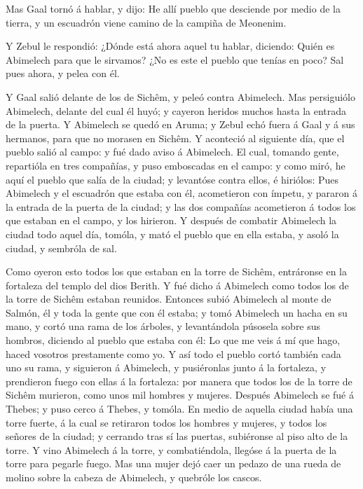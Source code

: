  Mas Gaal tornó á hablar, y dijo: He allí pueblo que
desciende por medio de la tierra, y un escuadrón viene camino de la
campiña de Meonenim.

 Y Zebul le respondió: ¿Dónde está ahora aquel tu hablar,
diciendo: Quién es Abimelech para que le sirvamos? ¿No es este el pueblo
que tenías en poco? Sal pues ahora, y pelea con él.

 Y Gaal salió delante de los de Sichêm, y peleó contra
Abimelech.  Mas persiguiólo Abimelech, delante del cual él
huyó; y cayeron heridos muchos hasta la entrada de la puerta.
 Y Abimelech se quedó en Aruma; y Zebul echó fuera á Gaal y
á sus hermanos, para que no morasen en Sichêm.  Y aconteció
al siguiente día, que el pueblo salió al campo: y fué dado aviso á
Abimelech.  El cual, tomando gente, repartióla en tres
compañías, y puso emboscadas en el campo: y como miró, he aquí el pueblo
que salía de la ciudad; y levantóse contra ellos, é hiriólos:
 Pues Abimelech y el escuadrón que estaba con él,
acometieron con ímpetu, y pararon á la entrada de la puerta de la
ciudad; y las dos compañías acometieron á todos los que estaban en el
campo, y los hirieron.  Y después de combatir Abimelech la
ciudad todo aquel día, tomóla, y mató el pueblo que en ella estaba, y
asoló la ciudad, y sembróla de sal.

 Como oyeron esto todos los que estaban en la torre de
Sichêm, entráronse en la fortaleza del templo del dios Berith.
 Y fué dicho á Abimelech como todos los de la torre de
Sichêm estaban reunidos.  Entonces subió Abimelech al monte
de Salmón, él y toda la gente que con él estaba; y tomó Abimelech un
hacha en su mano, y cortó una rama de los árboles, y levantándola
púsosela sobre sus hombros, diciendo al pueblo que estaba con él: Lo que
me veis á mí que hago, haced vosotros prestamente como yo. 
Y así todo el pueblo cortó también cada uno su rama, y siguieron á
Abimelech, y pusiéronlas junto á la fortaleza, y prendieron fuego con
ellas á la fortaleza: por manera que todos los de la torre de Sichêm
murieron, como unos mil hombres y mujeres.  Después
Abimelech se fué á Thebes; y puso cerco á Thebes, y tomóla.
 En medio de aquella ciudad había una torre fuerte, á la
cual se retiraron todos los hombres y mujeres, y todos los señores de la
ciudad; y cerrando tras sí las puertas, subiéronse al piso alto de la
torre.  Y vino Abimelech á la torre, y combatiéndola,
llegóse á la puerta de la torre para pegarle fuego.  Mas
una mujer dejó caer un pedazo de una rueda de molino sobre la cabeza de
Abimelech, y quebróle los cascos.

